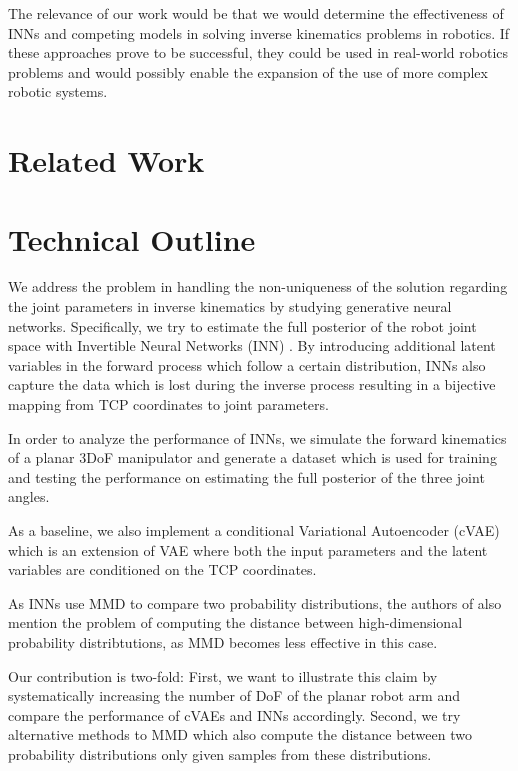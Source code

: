 \documentclass[conference]{IEEEtran}
\begin{document}
The relevance of our work would be that we would determine the effectiveness of INNs
and competing models in solving inverse kinematics problems in robotics.
If these approaches prove to be successful, they could be used in real-world robotics problems
and would possibly enable the expansion of the use of more complex robotic systems.

\section*{Related Work}

\section*{Technical Outline}

We address the problem in handling the non-uniqueness of the solution regarding the joint parameters in inverse kinematics by studying generative neural networks. Specifically, we try to estimate the full posterior of the robot joint space with Invertible Neural Networks (INN) \cite{Ardizzone2018}. By introducing additional latent variables in the forward process which follow a certain distribution, INNs also capture the data which is lost during the inverse process resulting in a bijective mapping from TCP coordinates to joint parameters.

In order to analyze the performance of INNs, we simulate the forward kinematics of a planar 3DoF manipulator and generate a dataset which is used for training and testing the performance on estimating the full posterior of the three joint angles.

As a baseline, we also implement a conditional Variational Autoencoder (cVAE) \cite{Sohn2015} which is an extension of VAE where both the input parameters and the latent variables are conditioned on the TCP coordinates.

As INNs use MMD to compare two probability distributions, the authors of \cite{Ardizzone2018} also mention the problem of computing the distance between high-dimensional probability distribtutions, as MMD becomes less effective in this case.

Our contribution is two-fold: First, we want to illustrate this claim by systematically increasing the number of DoF of the planar robot arm and compare the performance of cVAEs and INNs accordingly. Second, we try alternative methods to MMD which also compute the distance between two probability distributions only given samples from these distributions.



\end{document}
